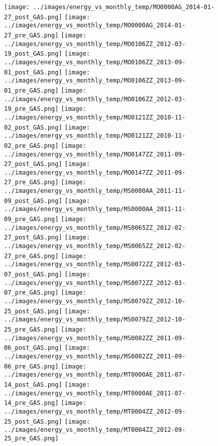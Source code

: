 \clearpage
\begin{figure}
\centering
\texttt{[image: ../images/energy\_vs\_monthly\_temp/MO0000AG\_2014-01-27\_post\_GAS.png]}
\texttt{[image: ../images/energy\_vs\_monthly\_temp/MO0000AG\_2014-01-27\_pre\_GAS.png]}
\texttt{[image: ../images/energy\_vs\_monthly\_temp/MO0106ZZ\_2012-03-19\_post\_GAS.png]}
\texttt{[image: ../images/energy\_vs\_monthly\_temp/MO0106ZZ\_2013-09-01\_post\_GAS.png]}
\texttt{[image: ../images/energy\_vs\_monthly\_temp/MO0106ZZ\_2013-09-01\_pre\_GAS.png]}
\texttt{[image: ../images/energy\_vs\_monthly\_temp/MO0106ZZ\_2012-03-19\_pre\_GAS.png]}
\texttt{[image: ../images/energy\_vs\_monthly\_temp/MO0121ZZ\_2010-11-02\_post\_GAS.png]}
\texttt{[image: ../images/energy\_vs\_monthly\_temp/MO0121ZZ\_2010-11-02\_pre\_GAS.png]}
\texttt{[image: ../images/energy\_vs\_monthly\_temp/MO0147ZZ\_2011-09-27\_post\_GAS.png]}
\texttt{[image: ../images/energy\_vs\_monthly\_temp/MO0147ZZ\_2011-09-27\_pre\_GAS.png]}
\texttt{[image: ../images/energy\_vs\_monthly\_temp/MS0000AA\_2011-11-09\_post\_GAS.png]}
\texttt{[image: ../images/energy\_vs\_monthly\_temp/MS0000AA\_2011-11-09\_pre\_GAS.png]}
\texttt{[image: ../images/energy\_vs\_monthly\_temp/MS0065ZZ\_2012-02-27\_post\_GAS.png]}
\texttt{[image: ../images/energy\_vs\_monthly\_temp/MS0065ZZ\_2012-02-27\_pre\_GAS.png]}
\texttt{[image: ../images/energy\_vs\_monthly\_temp/MS0072ZZ\_2012-03-07\_post\_GAS.png]}
\texttt{[image: ../images/energy\_vs\_monthly\_temp/MS0072ZZ\_2012-03-07\_pre\_GAS.png]}
\texttt{[image: ../images/energy\_vs\_monthly\_temp/MS0079ZZ\_2012-10-25\_post\_GAS.png]}
\texttt{[image: ../images/energy\_vs\_monthly\_temp/MS0079ZZ\_2012-10-25\_pre\_GAS.png]}
\texttt{[image: ../images/energy\_vs\_monthly\_temp/MS0082ZZ\_2011-09-06\_post\_GAS.png]}
\texttt{[image: ../images/energy\_vs\_monthly\_temp/MS0082ZZ\_2011-09-06\_pre\_GAS.png]}
\texttt{[image: ../images/energy\_vs\_monthly\_temp/MT0000AE\_2011-07-14\_post\_GAS.png]}
\texttt{[image: ../images/energy\_vs\_monthly\_temp/MT0000AE\_2011-07-14\_pre\_GAS.png]}
\texttt{[image: ../images/energy\_vs\_monthly\_temp/MT0004ZZ\_2012-09-25\_post\_GAS.png]}
\texttt{[image: ../images/energy\_vs\_monthly\_temp/MT0004ZZ\_2012-09-25\_pre\_GAS.png]}
\end{figure}
